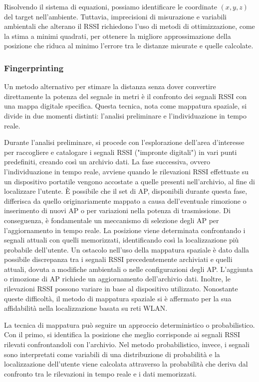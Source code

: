 Risolvendo il sistema di equazioni, possiamo identificare le coordinate $(x,y,z)$ del target nell'ambiente. Tuttavia, imprecisioni di misurazione e variabili ambientali che alterano il RSSI richiedono l'uso di metodi di ottimizzazione, come la stima a minimi quadrati, per ottenere la migliore approssimazione della posizione che riduca al minimo l'errore tra le distanze misurate e quelle calcolate.

\subsubsection{Fingerprinting}
\hspace{\parindent}Un metodo alternativo per stimare la distanza senza dover convertire direttamente la potenza del segnale in metri è il confronto dei segnali RSSI con una mappa digitale specifica. Questa tecnica, nota come mappatura spaziale, si divide in due momenti distinti: l'analisi preliminare e l'individuazione in tempo reale.

Durante l'analisi preliminare, si procede con l'esplorazione dell'area d'interesse per raccogliere e catalogare i segnali RSSI ("impronte digitali") in vari punti predefiniti, creando così un archivio dati. La fase successiva, ovvero l'individuazione in tempo reale, avviene quando le rilevazioni RSSI effettuate su un dispositivo portatile vengono accostate a quelle presenti nell'archivio, al fine di localizzare l'utente. È possibile che il set di AP, disponibili durante questa fase, differisca da quello originariamente mappato a causa dell'eventuale rimozione o inserimento di nuovi AP o per variazioni nella potenza di trasmissione. Di conseguenza, è fondamentale un meccanismo di selezione degli AP per l'aggiornamento in tempo reale. La posizione viene determinata confrontando i segnali attuali con quelli memorizzati, identificando così la localizzazione più probabile dell'utente. Un ostacolo nell'uso della mappatura spaziale è dato dalla possibile discrepanza tra i segnali RSSI precedentemente archiviati e quelli attuali, dovuta a modifiche ambientali o nelle configurazioni degli AP. L'aggiunta o rimozione di AP richiede un aggiornamento dell'archivio dati. Inoltre, le rilevazioni RSSI possono variare in base al dispositivo utilizzato. Nonostante queste difficoltà, il metodo di mappatura spaziale si è affermato per la sua affidabilità nella localizzazione basata su reti WLAN.

La tecnica di mappatura può seguire un approccio deterministico o probabilistico. Con il primo, si identifica la posizione che meglio corrisponde ai segnali RSSI rilevati confrontandoli con l'archivio. Nel metodo probabilistico, invece, i segnali sono interpretati come variabili di una distribuzione di probabilità e la localizzazione dell'utente viene calcolata attraverso la probabilità che deriva dal confronto tra le rilevazioni in tempo reale e i dati memorizzati.

